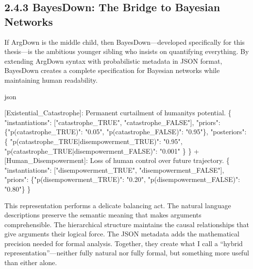 \documentclass[
  11pt,
  letterpaper,
]{book}
\newenvironment{Shaded}{\begin{snugshade}}{\end{snugshade}}
\newcommand{\DataTypeTok}[1]{\textcolor[rgb]{0.68,0.00,0.00}{#1}}
\newcommand{\ErrorTok}[1]{\textcolor[rgb]{0.68,0.00,0.00}{#1}}
\newcommand{\FunctionTok}[1]{\textcolor[rgb]{0.28,0.35,0.67}{#1}}
\newcommand{\OtherTok}[1]{\textcolor[rgb]{0.00,0.23,0.31}{#1}}
\newcommand{\StringTok}[1]{\textcolor[rgb]{0.13,0.47,0.30}{#1}}
\begin{document}
\subsection{2.4.3 BayesDown: The Bridge to Bayesian
Networks}\label{sec-bayesdown}

If ArgDown is the middle child, then BayesDown---developed specifically
for this thesis---is the ambitious younger sibling who insists on
quantifying everything. By extending ArgDown syntax with probabilistic
metadata in JSON format, BayesDown creates a complete specification for
Bayesian networks while maintaining human readability.

json

\begin{Shaded}
\begin{Highlighting}[]
\OtherTok{[}\ErrorTok{Existential\_Catastrophe}\OtherTok{]}\ErrorTok{:} \ErrorTok{Permanent} \ErrorTok{curtailment} \ErrorTok{of} \ErrorTok{humanity\textquotesingle{}s} \ErrorTok{potential.} \FunctionTok{\{}
  \DataTypeTok{"instantiations"}\FunctionTok{:} \OtherTok{[}\StringTok{"catastrophe\_TRUE"}\OtherTok{,} \StringTok{"catastrophe\_FALSE"}\OtherTok{]}\FunctionTok{,}
  \DataTypeTok{"priors"}\FunctionTok{:} \FunctionTok{\{}\DataTypeTok{"p(catastrophe\_TRUE)"}\FunctionTok{:} \StringTok{"0.05"}\FunctionTok{,} \DataTypeTok{"p(catastrophe\_FALSE)"}\FunctionTok{:} \StringTok{"0.95"}\FunctionTok{\},}
  \DataTypeTok{"posteriors"}\FunctionTok{:} \FunctionTok{\{}
    \DataTypeTok{"p(catastrophe\_TRUE|disempowerment\_TRUE)"}\FunctionTok{:} \StringTok{"0.95"}\FunctionTok{,}
    \DataTypeTok{"p(catastrophe\_TRUE|disempowerment\_FALSE)"}\FunctionTok{:} \StringTok{"0.001"}
  \FunctionTok{\}}
\FunctionTok{\}}
 \ErrorTok{+} \OtherTok{[}\ErrorTok{Human\_Disempowerment}\OtherTok{]}\ErrorTok{:} \ErrorTok{Loss} \ErrorTok{of} \ErrorTok{human} \ErrorTok{control} \ErrorTok{over} \ErrorTok{future} \ErrorTok{trajectory.} \FunctionTok{\{}
   \DataTypeTok{"instantiations"}\FunctionTok{:} \OtherTok{[}\StringTok{"disempowerment\_TRUE"}\OtherTok{,} \StringTok{"disempowerment\_FALSE"}\OtherTok{]}\FunctionTok{,}
   \DataTypeTok{"priors"}\FunctionTok{:} \FunctionTok{\{}\DataTypeTok{"p(disempowerment\_TRUE)"}\FunctionTok{:} \StringTok{"0.20"}\FunctionTok{,} \DataTypeTok{"p(disempowerment\_FALSE)"}\FunctionTok{:} \StringTok{"0.80"}\FunctionTok{\}}
 \FunctionTok{\}}
\end{Highlighting}
\end{Shaded}

This representation performs a delicate balancing act. The natural
language descriptions preserve the semantic meaning that makes arguments
comprehensible. The hierarchical structure maintains the causal
relationships that give arguments their logical force. The JSON metadata
adds the mathematical precision needed for formal analysis. Together,
they create what I call a ``hybrid representation''---neither fully
natural nor fully formal, but something more useful than either alone.
\end{document}
